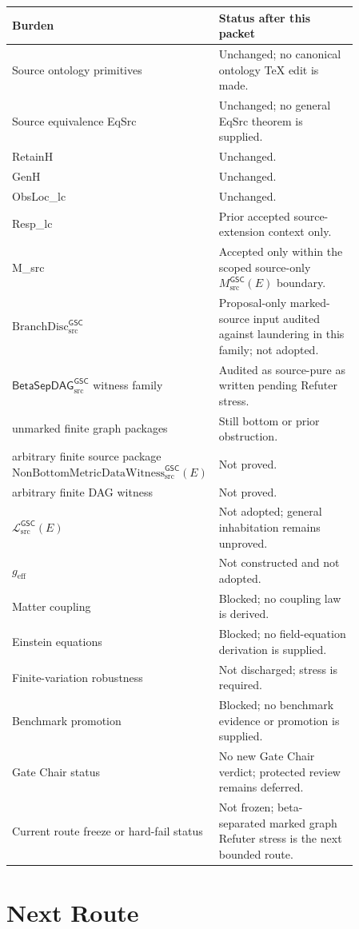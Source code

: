 \documentclass[11pt]{article}
\newcommand{\Witness}{\mathrm{NonBottomMetricDataWitness}_{\mathrm{src}}^{\mathsf{GSC}}}
\newcommand{\MetricData}{\mathcal{L}_{\mathrm{src}}^{\mathsf{GSC}}}
\newcommand{\geff}{g_{\mathrm{eff}}}
\newcommand{\BranchDisc}{\mathrm{BranchDisc}_{\mathrm{src}}^{\mathsf{GSC}}}
\newcommand{\BetaGraph}{\mathsf{BetaSepDAG}_{\mathrm{src}}^{\mathsf{GSC}}}
\begin{document}
\begin{longtable}{p{0.30\linewidth}p{0.56\linewidth}}
\toprule
Burden & Status after this packet \\
\midrule
Source ontology primitives & Unchanged; no canonical ontology TeX edit is made. \\
Source equivalence EqSrc & Unchanged; no general EqSrc theorem is supplied. \\
RetainH & Unchanged. \\
GenH & Unchanged. \\
ObsLoc\_lc & Unchanged. \\
Resp\_lc & Prior accepted source-extension context only. \\
M\_src & Accepted only within the scoped source-only \(M_{\mathrm{src}}^{\mathsf{GSC}}(E)\) boundary. \\
\(\BranchDisc\) & Proposal-only marked-source input audited against laundering in this family; not adopted. \\
\(\BetaGraph\) witness family & Audited as source-pure as written pending Refuter stress. \\
unmarked finite graph packages & Still bottom or prior obstruction. \\
arbitrary finite source package \(\Witness(E)\) & Not proved. \\
arbitrary finite DAG witness & Not proved. \\
\(\MetricData(E)\) & Not adopted; general inhabitation remains unproved. \\
\(\geff\) & Not constructed and not adopted. \\
Matter coupling & Blocked; no coupling law is derived. \\
Einstein equations & Blocked; no field-equation derivation is supplied. \\
Finite-variation robustness & Not discharged; stress is required. \\
Benchmark promotion & Blocked; no benchmark evidence or promotion is supplied. \\
Gate Chair status & No new Gate Chair verdict; protected review remains deferred. \\
Current route freeze or hard-fail status & Not frozen; beta-separated marked graph Refuter stress is the next bounded route. \\
\bottomrule
\end{longtable}

\section{Next Route}
\end{document}
